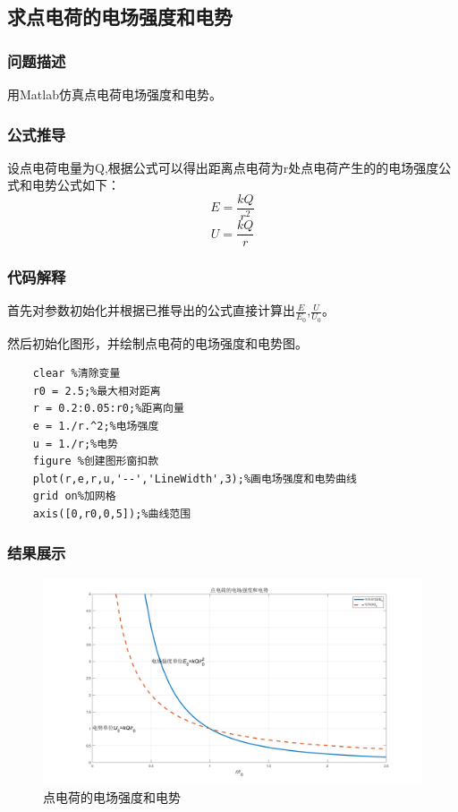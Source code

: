 \documentclass[UTF8]{article}
\numberwithin{figure}{subsection}
\numberwithin{table}{subsection}
\begin{document}
\begin{multicols}{2}
	\subsection{求点电荷的电场强度和电势}
	\subsubsection{问题描述}
	\par 用Matlab仿真点电荷电场强度和电势。
	\subsubsection{公式推导}
	\par 设点电荷电量为Q,根据公式可以得出距离点电荷为r处点电荷产生的的电场强度公式和电势公式如下：
	$$E = \frac{kQ}{r^2}$$
	$$U = \frac{kQ}{r}$$
	\subsubsection{代码解释}
	\par 首先对参数初始化并根据已推导出的公式直接计算出$\frac{E}{E_0}$,$\frac{U}{U_0}$。
	\par 然后初始化图形，并绘制点电荷的电场强度和电势图。
	\begin{lstlisting}
    clear %清除变量
    r0 = 2.5;%最大相对距离
    r = 0.2:0.05:r0;%距离向量
    e = 1./r.^2;%电场强度
    u = 1./r;%电势
    figure %创建图形窗扣款
    plot(r,e,r,u,'--','LineWidth',3);%画电场强度和电势曲线
    grid on%加网格
    axis([0,r0,0,5]);%曲线范围
	\end{lstlisting}
	\subsubsection{结果展示}
	\begin{figure}[H]
		\centering
		\includegraphics[scale=0.15]{点电荷电场强度和电势.png}
		\caption{点电荷的电场强度和电势}
	\end{figure}

\end{multicols}
\end{document}
